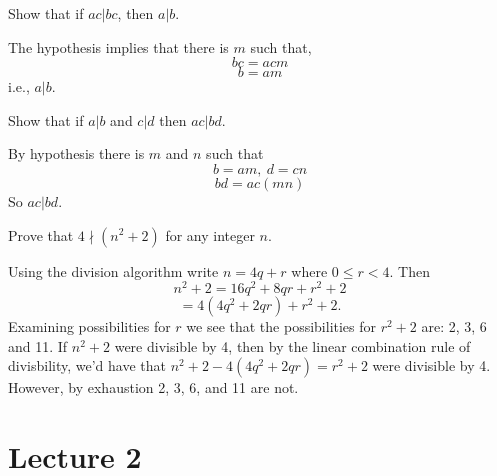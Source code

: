 \begin{questions}
    \question[3] Show that if $ac | bc$, then $a | b$.
    \begin{solution}
        The hypothesis implies that there is $m$ such that,
        $$bc = acm$$
        $$b = am$$
        i.e., $a | b$.
    \end{solution}

    \question[3] Show that if $a | b$ and $c | d$ then $ac | bd$.
    \begin{solution}
        By hypothesis there is $m$ and $n$ such that
        $$b = am,\ d = cn$$
        $$bd = ac(mn)$$
        So $ac | bd.$
    \end{solution}

    \question[8] Prove that $4 \nmid (n^2 + 2)$ for any integer $n$.
    \begin{solution}
        Using the division algorithm write $n = 4q + r$ where $0 \le r
        < 4.$ Then 
        $$n^2 + 2 = 16q^2 + 8qr + r^2 + 2$$
        $$ = 4(4q^2 + 2qr) + r^2 + 2.$$
        Examining possibilities for $r$ we see that the possibilities
        for $r^2 + 2$ are: 2, 3, 6 and 11. If $n^2 + 2$ were divisible
        by 4, then by the linear combination rule of divisbility, we'd
        have that $n^2 +2 - 4(4q^2 + 2qr) = r^2 + 2$ were divisible by
        4. However, by exhaustion 2, 3, 6, and 11 are not. 
    \end{solution}
\end{questions}

\section{Lecture 2}

\begin{questions}




\end{questions}


